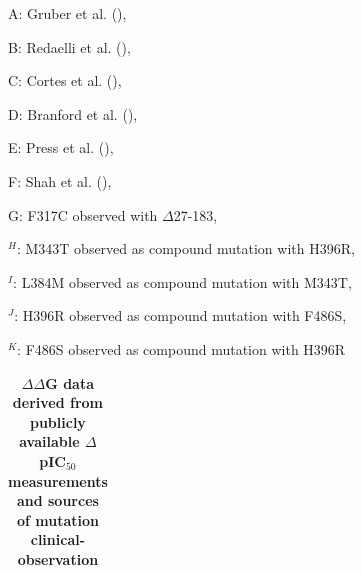 \documentclass[phd,tocprelim]{cornell}
\begin{document}
\begin{landscape}
\realsinglespacing
\begin{ThreePartTable}
	\begin{TableNotes}
		\footnotesize
		\item{A}: Gruber et al. (\cite{Gruber:Med.Oncol.:2012}), %
		\item{B}: Redaelli et al. (\cite{Redaelli:2012ci}), %
		\item{C}: Cortes et al. (\cite{Cortes:N.Engl.J.Med.:2012}), %
		\item{D}: Branford et al. (\cite{Branford:Blood:2002}), %
		\item{E}: Press et al. (\cite{Press:2009jn}), %
		\item{F}: Shah et al. (\cite{Shah:CancerCell:2002}), %
		\item{G}: F317C observed with $\Delta$27-183, %
		\item{$^H$}: M343T observed as compound mutation with H396R, %
		\item{$^I$}: L384M observed as compound mutation with M343T, %
		\item{$^J$}: H396R observed as compound mutation with F486S, %
		\item{$^K$}: F486S observed as compound mutation with H396R 
	\end{TableNotes}
\begin{longtable}[c]{llllllllll}
	\caption[ $\Delta \Delta$G data derived from publicly available $\Delta$pIC$_{50}$ measurements and sources of mutation clinical-observation]{
		{\bf $\Delta \Delta$G data derived from publicly available $\Delta$pIC$_{50}$ measurements and sources of mutation clinical-observation}		
	}
	

\end{longtable}
\end{ThreePartTable}
\end{landscape}
\end{document}
